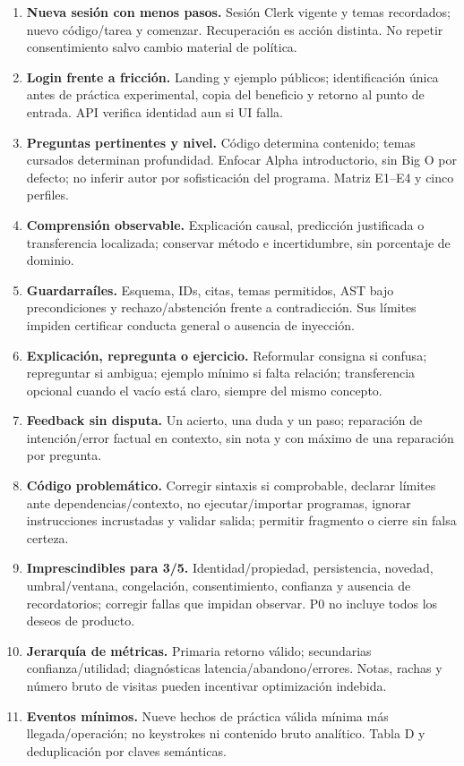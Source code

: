 \documentclass[11pt,a4paper]{report}
\begin{document}
\begin{enumerate}
\item \textbf{Nueva sesión con menos pasos.} Sesión Clerk vigente y temas recordados; nuevo código/tarea y comenzar. Recuperación es acción distinta. No repetir consentimiento salvo cambio material de política.
\item \textbf{Login frente a fricción.} Landing y ejemplo públicos; identificación única antes de práctica experimental, copia del beneficio y retorno al punto de entrada. API verifica identidad aun si UI falla.
\item \textbf{Preguntas pertinentes y nivel.} Código determina contenido; temas cursados determinan profundidad. Enfocar Alpha introductorio, sin Big O por defecto; no inferir autor por sofisticación del programa. Matriz E1--E4 y cinco perfiles.
\item \textbf{Comprensión observable.} Explicación causal, predicción justificada o transferencia localizada; conservar método e incertidumbre, sin porcentaje de dominio.
\item \textbf{Guardarraíles.} Esquema, IDs, citas, temas permitidos, AST bajo precondiciones y rechazo/abstención frente a contradicción. Sus límites impiden certificar conducta general o ausencia de inyección.
\item \textbf{Explicación, repregunta o ejercicio.} Reformular consigna si confusa; repreguntar si ambigua; ejemplo mínimo si falta relación; transferencia opcional cuando el vacío está claro, siempre del mismo concepto.
\item \textbf{Feedback sin disputa.} Un acierto, una duda y un paso; reparación de intención/error factual en contexto, sin nota y con máximo de una reparación por pregunta.
\item \textbf{Código problemático.} Corregir sintaxis si comprobable, declarar límites ante dependencias/contexto, no ejecutar/importar programas, ignorar instrucciones incrustadas y validar salida; permitir fragmento o cierre sin falsa certeza.
\item \textbf{Imprescindibles para 3/5.} Identidad/propiedad, persistencia, novedad, umbral/ventana, congelación, consentimiento, confianza y ausencia de recordatorios; corregir fallas que impidan observar. P0 no incluye todos los deseos de producto.
\item \textbf{Jerarquía de métricas.} Primaria retorno válido; secundarias confianza/utilidad; diagnósticas latencia/abandono/errores. Notas, rachas y número bruto de visitas pueden incentivar optimización indebida.
\item \textbf{Eventos mínimos.} Nueve hechos de práctica válida mínima más llegada/operación; no keystrokes ni contenido bruto analítico. Tabla D y deduplicación por claves semánticas.

\end{enumerate}
\end{document}

